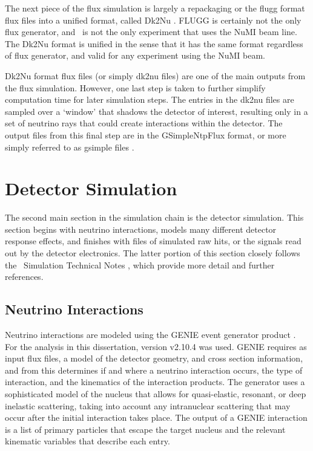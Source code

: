 The next piece of the flux simulation is largely a repackaging or the flugg format flux files into a unified format, called Dk2Nu \cite{ref:Dk2Nu}. FLUGG is certainly not the only flux generator, and \nova~is not the only experiment that uses the NuMI beam line. The Dk2Nu format is unified in the sense that it has the same format regardless of flux generator, and valid for any experiment using the NuMI beam.

Dk2Nu format flux files (or simply dk2nu files) are one of the main outputs from the flux simulation. However, one last step is taken to further simplify computation time for later simulation steps. The entries in the dk2nu files are sampled over a `window' that shadows the detector of interest, resulting only in a set of neutrino rays that could create interactions within the detector. The output files from this final step are in the GSimpleNtpFlux format, or more simply referred to as gsimple files \cite{ref:gsimple}.

\section{Detector Simulation}
\label{sec:SimDet}

The second main section in the simulation chain is the detector simulation. This section begins with neutrino interactions, models many different detector response effects, and finishes with files of simulated raw hits, or the signals read out by the detector electronics. The latter portion of this section closely follows the \nova~Simulation Technical Notes \cite{ref:TNDetSimFA, ref:TNDetSimSA}, which provide more detail and further references.

\subsection{Neutrino Interactions}
\label{sec:SimGENIE}

Neutrino interactions are modeled using the GENIE event generator product \cite{ref:GENIEGen, ref:GENIE}. For the analysis in this dissertation, version v2.10.4 was used. GENIE requires as input flux files, a model of the detector geometry, and cross section information, and from this determines if and where a neutrino interaction occurs, the type of interaction, and the kinematics of the interaction products. The generator uses a sophisticated model of the nucleus that allows for quasi-elastic, resonant, or deep inelastic scattering, taking into account any intranuclear scattering that may occur after the initial interaction takes place. The output of a GENIE interaction is a list of primary particles that escape the target nucleus and the relevant kinematic variables that describe each entry.

